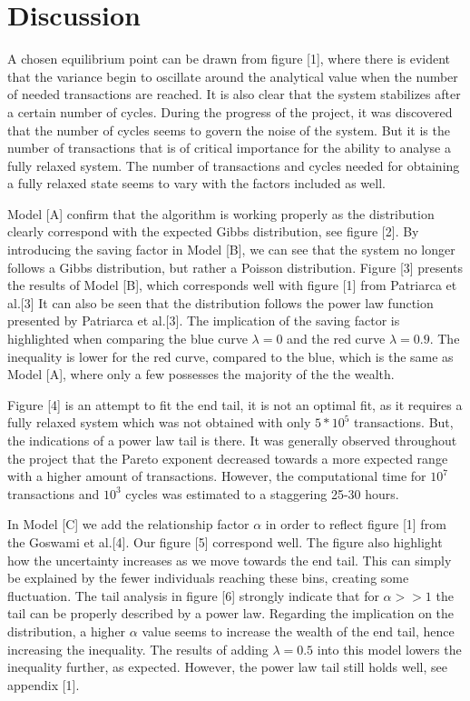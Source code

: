 \documentclass[a4paper,11pt]{article}
\begin{document}
\section{Discussion}
A chosen equilibrium point can be drawn from figure [1], where there is evident that the variance begin to oscillate around the analytical value when the number of needed transactions are reached. It is also clear that the system stabilizes after a certain number of cycles. During the progress of the project, it was discovered that the number of cycles seems to govern the noise of the system. But it is the number of transactions that is of critical importance for the ability to analyse a fully relaxed system. The number of transactions and cycles needed for obtaining a fully relaxed state seems to vary with the factors included as well.
\\
\par
Model [A] confirm that the algorithm is working properly as the distribution clearly correspond with the expected Gibbs distribution, see figure [2]. By introducing the saving factor in Model [B], we can see that the system no longer follows a Gibbs distribution, but rather a Poisson distribution. Figure [3] presents the results of Model [B], which corresponds well with figure [1] from Patriarca et al.[3] It can also be seen that the distribution follows the power law function presented by Patriarca et al.[3]. The implication of the saving factor is highlighted when comparing the blue curve $\lambda = 0$ and the red curve $\lambda = 0.9$. The inequality is lower for the red curve, compared to the blue, which is the same as Model [A], where only a few possesses the majority of the the wealth.
\\
\par
Figure [4] is an attempt to fit the end tail, it is not an optimal fit, as it requires a fully relaxed system which was not obtained with only $5*10^5$ transactions. But, the indications of a power law tail is there. It was generally observed throughout the project that the Pareto exponent decreased towards a more expected range with a higher amount of transactions. However, the computational time for $10^7$ transactions and $10^3$ cycles was estimated to a staggering 25-30 hours.
\\
\par
In Model [C] we add the relationship factor $\alpha$ in order to reflect figure [1] from the Goswami et al.[4]. Our figure [5] correspond well. The figure also highlight how the uncertainty increases as we move towards the end tail. This can simply be explained by the fewer individuals reaching these bins, creating some fluctuation. The tail analysis in figure [6] strongly indicate that for $\alpha >> 1$ the tail can be properly described by a power law. Regarding the implication on the distribution, a higher $\alpha$ value seems to increase the wealth of the end tail, hence increasing the inequality. The results of adding $\lambda = 0.5$ into this model lowers the inequality further, as expected. However, the power law tail still holds well, see appendix [1].
\end{document}
